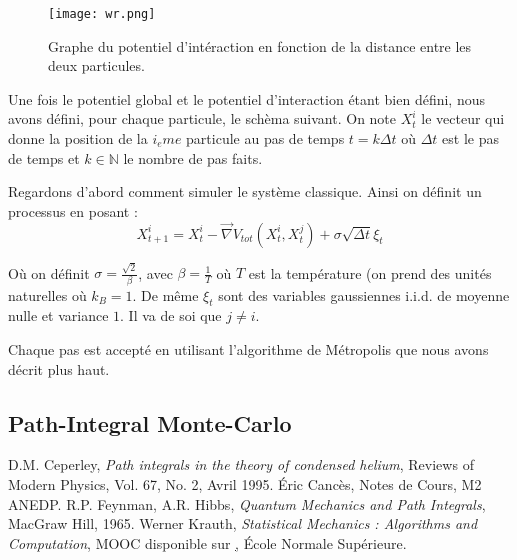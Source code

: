 \documentclass[11pt]{article}
\theoremstyle{definition}
\theoremstyle{remark}
\begin{document}
\begin{figure}[h]
\centering
\texttt{[image: wr.png]}
\caption{Graphe du potentiel d'intéraction en fonction de la distance entre les deux particules.}\label{fig:inter}
\end{figure} 

Une fois le potentiel global et le potentiel d'interaction étant bien défini, nous avons défini, pour chaque particule, le schèma suivant. On note $X^{i}_t$ le vecteur qui donne la position de la $i_eme$ particule au pas de temps $t=k\Delta t$ où $\Delta t$ est le pas de temps et $k\in \mathbb{N}$ le nombre de pas faits.

Regardons d'abord comment simuler le système classique. Ainsi on définit un processus en posant : 
\begin{equation}
X^{i}_{t+1}=X^{i}_t-\vec{\nabla}V_{tot}(X^{i}_t,X^j_t)+\sigma \sqrt{\Delta t}\xi_t
\end{equation} 

Où on définit $\sigma =\frac{\sqrt{2}}{\beta}$, avec $\beta=\frac{1}{T}$ où $T$ est la température (on prend des unités naturelles où $k_B=1$. De même $\xi_t$ sont des variables gaussiennes i.i.d. de moyenne nulle et variance $1$. Il va de soi que $j\neq i$.

Chaque pas est accepté en utilisant l'algorithme de Métropolis que nous avons décrit plus haut.
\subsection{Path-Integral Monte-Carlo}

\newpage
\begin{thebibliography}{analytique}
D.M. Ceperley, \textit{Path integrals in the theory of condensed helium}, Reviews of Modern Physics, Vol. 67, No. 2, Avril 1995.
Éric Cancès, Notes de Cours, M2 ANEDP.
R.P. Feynman, A.R. Hibbs, \textit{Quantum Mechanics and Path Integrals}, MacGraw Hill, 1965.
 Werner Krauth, \textit{Statistical Mechanics : Algorithms and Computation}, MOOC disponible sur \href{http://coursera.org}, École Normale Supérieure. 
\end{thebibliography}
\end{document}
